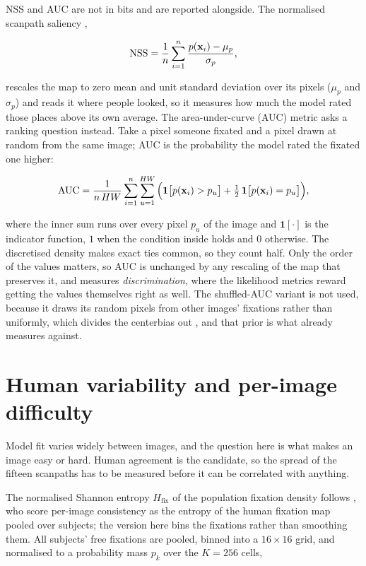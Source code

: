 NSS and AUC are not in bits and are reported alongside.
The normalised scanpath saliency \citep{peters2005nss},

\begin{equation}
  \mathrm{NSS} = \frac{1}{n} \sum_{i=1}^{n} \frac{p(\mathbf{x}_i) - \mu_p}{\sigma_p},
  \label{eq:nss}
\end{equation}

rescales the map to zero mean and unit standard deviation over its pixels ($\mu_p$ and $\sigma_p$) and
reads it where people looked, so it measures how much the model rated those places above its own
average.
The area-under-curve (AUC) metric asks a ranking question instead. Take a pixel someone fixated and a
pixel drawn at random from the same image; AUC is the probability the model rated the fixated one
higher:

\begin{equation}
  \mathrm{AUC} = \frac{1}{n\,HW} \sum_{i=1}^{n} \sum_{u=1}^{HW}
    \Big(\mathbf{1}\big[p(\mathbf{x}_i) > p_u\big]
       + \tfrac{1}{2}\,\mathbf{1}\big[p(\mathbf{x}_i) = p_u\big]\Big),
  \label{eq:auc}
\end{equation}

where the inner sum runs over every pixel $p_u$ of the image and $\mathbf{1}[\cdot]$ is the indicator
function, $1$ when the condition inside holds and $0$ otherwise. The discretised density makes exact
ties common, so they count half.
Only the order of the values matters, so AUC is unchanged by any rescaling of the map that preserves
it, and measures \emph{discrimination}, where the likelihood metrics reward getting the values
themselves right as well.
The shuffled-AUC variant is not used, because it draws its random pixels from other images' fixations
rather than uniformly, which divides the centerbias out \citep{kummerer2018benchmarking}, and that prior is
what  already measures against.

\section{Human variability and per-image difficulty}
\label{sec:multi-subject}
\label{subsec:difficulty-proxies}

Model fit varies widely between images, and the question here is what makes an image easy or hard. Human
agreement is the candidate, so the spread of the fifteen scanpaths has to be measured before it can be
correlated with anything.

The normalised Shannon entropy $H_{\text{fix}}$ of the population fixation density follows
\citet{judd2009mit1003}, who score per-image consistency as the entropy of the human fixation map pooled
over subjects; the version here bins the fixations rather than smoothing them.
All subjects' free fixations are pooled, binned into a $16 \times 16$ grid, and normalised to a probability
mass $p_k$ over the $K = 256$ cells,

